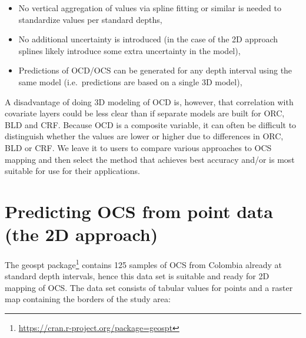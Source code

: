 \documentclass[graybox,natbib,nospthms,UStrade]{svmono}
\newenvironment{Shaded}{\begin{snugshade}}{\end{snugshade}}
\newcommand{\CommentTok}[1]{\textcolor[rgb]{0.37,0.37,0.37}{\textit{#1}}}
\newcommand{\KeywordTok}[1]{\textcolor[rgb]{0.27,0.27,0.27}{\textbf{#1}}}
\newcommand{\NormalTok}[1]{#1}
\newcommand{\StringTok}[1]{\textcolor[rgb]{0.5,0.5,0.5}{#1}}
\renewcommand{\href}[2]{#2 (\url{#1})}
\renewcommand{\href}[2]{#2\footnote{\url{#1}}}
\begin{document}
\begin{itemize}
\item
  No vertical aggregation of values via spline fitting or similar is needed to standardize values per standard depths,
\item
  No additional uncertainty is introduced (in the case of the 2D approach splines likely introduce some extra uncertainty in the model),
\item
  Predictions of OCD/OCS can be generated for any depth interval using the same model (i.e.~predictions are based on a single 3D model),
\end{itemize}

A disadvantage of doing 3D modeling of OCD is, however, that correlation with covariate layers could be less clear than if separate models are built for ORC, BLD and CRF. Because OCD is a composite variable, it can often be difficult to distinguish whether the values are lower or higher due to differences in ORC, BLD or CRF. We leave it to users to compare various approaches to OCS mapping and then select the method that achieves best accuracy and/or is most suitable for use for their applications.

\hypertarget{predicting-ocs-from-point-data-the-2d-approach}{%
\section{Predicting OCS from point data (the 2D approach)}\label{predicting-ocs-from-point-data-the-2d-approach}}

The \href{https://cran.r-project.org/package=geospt}{geospt package} contains 125 samples of OCS from Colombia already at standard depth intervals, hence this data set is suitable and ready for 2D mapping of OCS. The data set consists of tabular values for points and a raster map containing the borders of the study area:

\begin{Shaded}
\end{Shaded}
\end{document}
